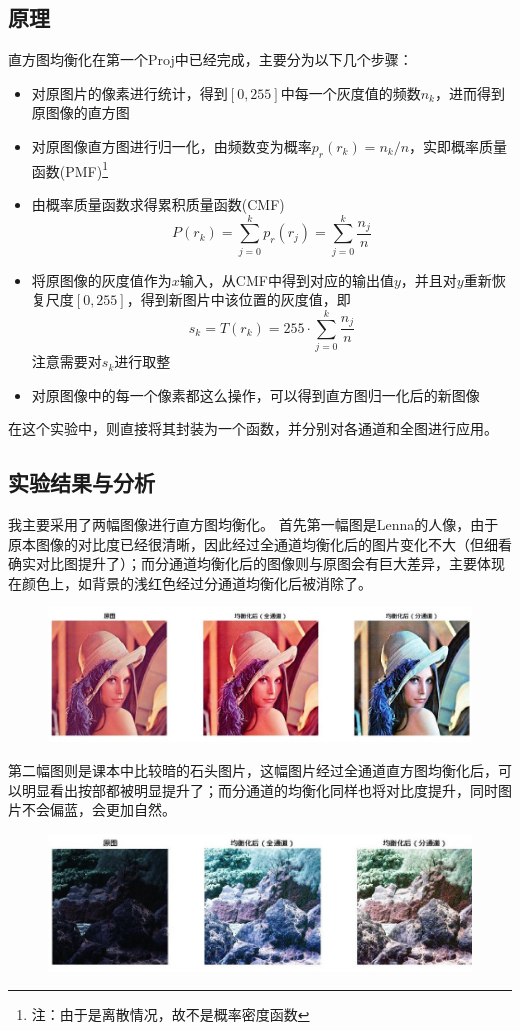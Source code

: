 \documentclass[logo,reportComp]{thesis}
\begin{document}
\subsection{原理}
直方图均衡化在第一个Proj中已经完成，主要分为以下几个步骤：
\begin{itemize}
	\item 对原图片的像素进行统计，得到$[0,255]$中每一个灰度值的频数$n_k$，进而得到原图像的直方图
	\item 对原图像直方图进行归一化，由频数变为概率$p_r(r_k)=n_k/n$，实即概率质量函数(PMF)\footnote{注：由于是离散情况，故不是概率密度函数}
	\item 由概率质量函数求得累积质量函数(CMF)
	\[P(r_k)=\sum_{j=0}^kp_r(r_j)=\sum_{j=0}^k\frac{n_j}{n}\]
	\item 将原图像的灰度值作为$x$输入，从CMF中得到对应的输出值$y$，并且对$y$重新恢复尺度$[0,255]$，得到新图片中该位置的灰度值，即
	\[s_k=T(r_k)=255\cdot\sum_{j=0}^k\frac{n_j}{n}\]
	注意需要对$s_k$进行取整
	\item 对原图像中的每一个像素都这么操作，可以得到直方图归一化后的新图像
\end{itemize}
在这个实验中，则直接将其封装为一个函数，并分别对各通道和全图进行应用。

\subsection{实验结果与分析}
我主要采用了两幅图像进行直方图均衡化。
首先第一幅图是Lenna的人像，由于原本图像的对比度已经很清晰，因此经过全通道均衡化后的图片变化不大（但细看确实对比图提升了）；而分通道均衡化后的图像则与原图会有巨大差异，主要体现在颜色上，如背景的浅红色经过分通道均衡化后被消除了。
\begin{figure}[H]
\centering
\includegraphics[width=\linewidth]{fig/histeq.jpg}
\end{figure}

第二幅图则是课本中比较暗的石头图片，这幅图片经过全通道直方图均衡化后，可以明显看出按部都被明显提升了；而分通道的均衡化同样也将对比度提升，同时图片不会偏蓝，会更加自然。
\begin{figure}[H]
\centering
\includegraphics[width=\linewidth]{fig/histeq2.jpg}
\end{figure}
\end{document}
